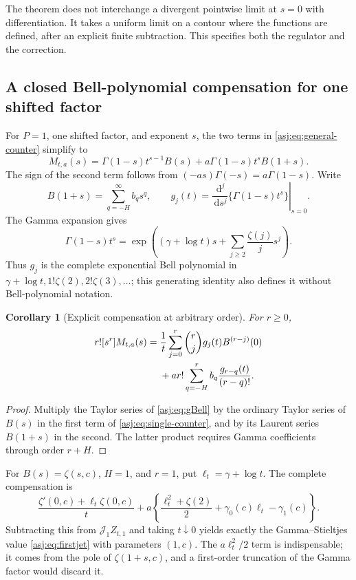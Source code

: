 \documentclass[11pt]{article}
\numberwithin{equation}{section}
\newtheorem{corollary}[theorem]{Corollary}
\theoremstyle{definition}\newtheorem{definition}[theorem]{Definition}
\theoremstyle{remark}\newtheorem{remark}[theorem]{Remark}\newtheorem{example}[theorem]{Example}
\newcommand{\calJ}{\mathcal J}\newcommand{\calZ}{\mathcal Z}
\newcommand{\dd}{\,\mathrm d}\newcommand{\Rea}{\operatorname{Re}}
\begin{document}
The theorem does not interchange a divergent pointwise limit at $s=0$
with differentiation. It takes a uniform limit on a contour where the
functions are defined, after an explicit finite subtraction. This
specifies both the regulator and the correction.

\subsection{A closed Bell-polynomial compensation for one shifted factor}
For $P=1$, one shifted factor, and exponent $s$, the two terms in
\eqref{asj:eq:general-counter} simplify to
\begin{equation}\label{asj:eq:single-counter}
 M_{t,a}(s)=\Gamma(1-s)t^{s-1}B(s)
                 +a\Gamma(1-s)t^sB(1+s).
\end{equation}
The sign of the second term follows from
$(-as)\Gamma(-s)=a\Gamma(1-s)$.
Write
\[
 B(1+s)=\sum_{q=-H}^{\infty}b_qs^q,\qquad
 g_j(t)=\left.\frac{\dd^j}{\dd s^j}\{\Gamma(1-s)t^s\}\right|_{s=0}.
\]
The Gamma expansion \cite{dlmf-gamma} gives
\begin{equation}\label{asj:eq:gBell}
 \Gamma(1-s)t^s
   =\exp\left((\gamma+\log t)s
                     +\sum_{j\ge2}\frac{\zeta(j)}j s^j\right).
\end{equation}
Thus $g_j$ is the complete exponential Bell polynomial in
$\gamma+\log t,1!\zeta(2),2!\zeta(3),\ldots$; this generating identity
also defines it without Bell-polynomial notation.

\begin{corollary}[Explicit compensation at arbitrary order]
\label{asj:thm:bellcounter}
For $r\ge0$,
\begin{align}\label{asj:eq:Bellcounter}
 r![s^r]M_{t,a}(s)
   ={}&\frac1t\sum_{j=0}^r\binom rj g_j(t)B^{(r-j)}(0)\notag\\
     &+a r!\sum_{q=-H}^{r}b_q\frac{g_{r-q}(t)}{(r-q)!}.
\end{align}
\end{corollary}
\begin{proof}
Multiply the Taylor series of \eqref{asj:eq:gBell} by the ordinary Taylor
series of $B(s)$ in the first term of \eqref{asj:eq:single-counter}, and
by its Laurent series $B(1+s)$ in the second. The latter product
requires Gamma coefficients through order $r+H$.
\end{proof}

For $B(s)=\zeta(s,c)$, $H=1$, and $r=1$, put
$\ell_t=\gamma+\log t$. The complete compensation is
\begin{equation}\label{asj:eq:first-counter}
 \frac{\zeta'(0,c)+\ell_t\zeta(0,c)}t
     +a\left\{\frac{\ell_t^2+\zeta(2)}2
                    +\gamma_0(c)\ell_t-\gamma_1(c)\right\}.
\end{equation}
Subtracting this from $\calJ_1Z_{t,1}$ and taking $t\downarrow0$ yields
exactly the Gamma--Stieltjes value \eqref{asj:eq:firstjet} with parameters
$(1,c)$. The $a\ell_t^2/2$ term is indispensable; it comes from the
pole of $\zeta(1+s,c)$, and a first-order truncation of the Gamma factor
would discard it.
\end{document}
